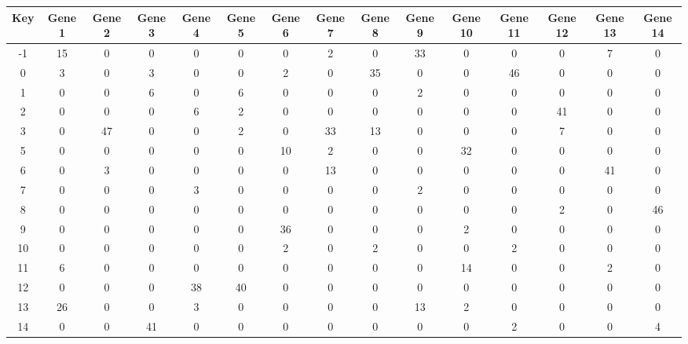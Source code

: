 \begin{tabular}{|c|c|c|c|c|c|c|c|c|c|c|c|c|c|c|}
\hline
Key & Gene 1 & Gene 2 & Gene 3 & Gene 4 & Gene 5 & Gene 6 & Gene 7 & Gene 8 & Gene 9 & Gene 10 & Gene 11 & Gene 12 & Gene 13 & Gene 14 \\
\hline
-1 & 15 & 0 & 0 & 0 & 0 & 0 & 2 & 0 & 33 & 0 & 0 & 0 & 7 & 0 \\
0 & 3 & 0 & 3 & 0 & 0 & 2 & 0 & 35 & 0 & 0 & 46 & 0 & 0 & 0 \\
1 & 0 & 0 & 6 & 0 & 6 & 0 & 0 & 0 & 2 & 0 & 0 & 0 & 0 & 0 \\
2 & 0 & 0 & 0 & 6 & 2 & 0 & 0 & 0 & 0 & 0 & 0 & 41 & 0 & 0 \\
3 & 0 & 47 & 0 & 0 & 2 & 0 & 33 & 13 & 0 & 0 & 0 & 7 & 0 & 0 \\
5 & 0 & 0 & 0 & 0 & 0 & 10 & 2 & 0 & 0 & 32 & 0 & 0 & 0 & 0 \\
6 & 0 & 3 & 0 & 0 & 0 & 0 & 13 & 0 & 0 & 0 & 0 & 0 & 41 & 0 \\
7 & 0 & 0 & 0 & 3 & 0 & 0 & 0 & 0 & 2 & 0 & 0 & 0 & 0 & 0 \\
8 & 0 & 0 & 0 & 0 & 0 & 0 & 0 & 0 & 0 & 0 & 0 & 2 & 0 & 46 \\
9 & 0 & 0 & 0 & 0 & 0 & 36 & 0 & 0 & 0 & 2 & 0 & 0 & 0 & 0 \\
10 & 0 & 0 & 0 & 0 & 0 & 2 & 0 & 2 & 0 & 0 & 2 & 0 & 0 & 0 \\
11 & 6 & 0 & 0 & 0 & 0 & 0 & 0 & 0 & 0 & 14 & 0 & 0 & 2 & 0 \\
12 & 0 & 0 & 0 & 38 & 40 & 0 & 0 & 0 & 0 & 0 & 0 & 0 & 0 & 0 \\
13 & 26 & 0 & 0 & 3 & 0 & 0 & 0 & 0 & 13 & 2 & 0 & 0 & 0 & 0 \\
14 & 0 & 0 & 41 & 0 & 0 & 0 & 0 & 0 & 0 & 0 & 2 & 0 & 0 & 4 \\
\hline
\end{tabular}